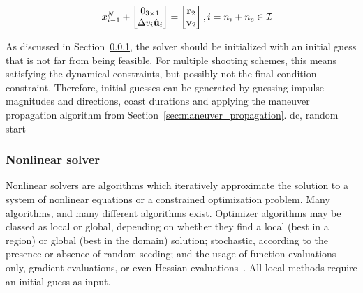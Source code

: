 \begin{align}
\begin{tabular}{cl}
                                & \(x_{i-1}^N + \begin{bmatrix}
                                    0_{3\times1} \\ \Delta v_i \hat{\mathbf{u}}_i
                                \end{bmatrix} = \begin{bmatrix}
                                    \mathbf{r}_2 \\ \mathbf{v}_2
                                \end{bmatrix}, i = n_i+n_c \in \mathcal{I}\)
    \end{tabular}
 \end{align}


As discussed in Section~\ref{sssec:solver}, the solver should be initialized with an initial guess that is not far from being feasible. For multiple shooting schemes, this means satisfying the dynamical constraints, but possibly not the final condition constraint. Therefore, initial guesses can be generated by guessing impulse magnitudes and directions, coast durations and applying the maneuver propagation algorithm from Section~\ref{sec:maneuver_propagation}. dc, random start

\subsubsection{Nonlinear solver}\label{sssec:solver}

Nonlinear solvers are algorithms which iteratively approximate the solution to a system of nonlinear equations or a constrained optimization problem. Many algorithms, and many different algorithms exist. Optimizer algorithms may be classed as local or global, depending on whether they find a local (best in a region) or global (best in the domain) solution; stochastic, according to the presence or absence of random seeding; and the usage of function evaluations only, gradient evaluations, or even Hessian evaluations~\cite{numerical_recipes}. All local methods require an initial guess as input.

